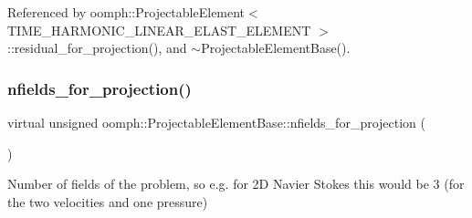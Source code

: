 Referenced by oomph\+::\+Projectable\+Element$<$ T\+I\+M\+E\+\_\+\+H\+A\+R\+M\+O\+N\+I\+C\+\_\+\+L\+I\+N\+E\+A\+R\+\_\+\+E\+L\+A\+S\+T\+\_\+\+E\+L\+E\+M\+E\+N\+T $>$\+::residual\+\_\+for\+\_\+projection(), and $\sim$\+Projectable\+Element\+Base().

\mbox{\label{classoomph_1_1ProjectableElementBase_a44634aa4049332a580d249c25564638c}} 
\subsubsection{\texorpdfstring{nfields\+\_\+for\+\_\+projection()}{nfields\_for\_projection()}}
{\footnotesize\ttfamily virtual unsigned oomph\+::\+Projectable\+Element\+Base\+::nfields\+\_\+for\+\_\+projection (\begin{DoxyParamCaption}{ }\end{DoxyParamCaption})\hspace{0.3cm}{\ttfamily [pure virtual]}}



Number of fields of the problem, so e.\+g. for 2D Navier Stokes this would be 3 (for the two velocities and one pressure) 



